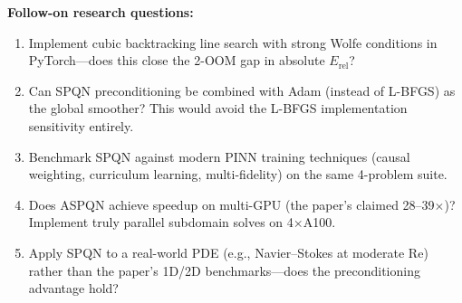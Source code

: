 \documentclass[11pt]{article}
\begin{document}
\noindent\textbf{Follow-on research questions:}
\begin{enumerate}[leftmargin=1.6em,itemsep=0.2em,topsep=0.2em,label=Q\arabic*.]
\item Implement cubic backtracking line search with strong Wolfe conditions in PyTorch---does this close the 2-OOM gap in absolute $E_{\mathrm{rel}}$?
\item Can SPQN preconditioning be combined with Adam (instead of L-BFGS) as the global smoother? This would avoid the L-BFGS implementation sensitivity entirely.
\item Benchmark SPQN against modern PINN training techniques (causal weighting, curriculum learning, multi-fidelity) on the same 4-problem suite.
\item Does ASPQN achieve speedup on multi-GPU (the paper's claimed 28--39$\times$)? Implement truly parallel subdomain solves on 4$\times$A100.
\item Apply SPQN to a real-world PDE (e.g., Navier--Stokes at moderate Re) rather than the paper's 1D/2D benchmarks---does the preconditioning advantage hold?
\end{enumerate}
\end{document}
